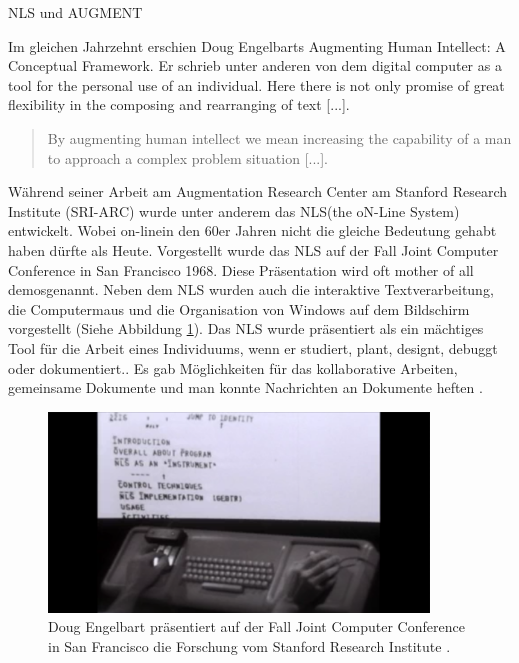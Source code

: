 \begin{section}{NLS und AUGMENT}
\label{sec:nls}

Im gleichen Jahrzehnt erschien Doug Engelbarts \glqq Augmenting Human Intellect: A Conceptual Framework\grqq{ }. Er schrieb unter anderen von dem \glqq digital computer as a tool for the personal use of an individual. Here there is not only promise of great flexibility in the composing and rearranging of text [...]\grqq{ }\cite[S. 17]{Engelbart1962}.

\begin{quote}
\glqq By augmenting human intellect we mean increasing the capability of a man to approach a complex problem situation [...].\grqq{ }\cite[S. 1]{Engelbart1962}
\end{quote}

Während seiner Arbeit am Augmentation Research Center am Stanford Research Institute (SRI-ARC) wurde unter anderem das \glqq NLS\grqq{ }(the oN-Line System) entwickelt. Wobei \glqq on-line\grqq{ }in den 60er Jahren nicht die gleiche Bedeutung gehabt haben dürfte als Heute. Vorgestellt wurde das NLS auf der Fall Joint Computer Conference in San Francisco 1968. Diese Präsentation wird oft \glqq mother of all demos\grqq{ }genannt. Neben dem NLS wurden auch die interaktive Textverarbeitung, die Computermaus und die Organisation von Windows auf dem Bildschirm vorgestellt (Siehe Abbildung \ref{fig:mother}). Das NLS wurde präsentiert als \glqq ein mächtiges Tool für die Arbeit eines Individuums, wenn er studiert, plant, designt, debuggt oder dokumentiert.\grqq{ }\cite{MotherOfDemo1968}. Es gab Möglichkeiten für das kollaborative Arbeiten, gemeinsame Dokumente und man konnte Nachrichten an Dokumente heften \cite{MotherOfDemo1968}. 

\begin{figure}[!ht]
	\centering
	\includegraphics[width=0.9\textwidth]{image/mother}
	\caption{Doug Engelbart präsentiert auf der Fall Joint Computer Conference in San Francisco die Forschung vom Stanford Research Institute \cite{MotherOfDemo1968}.}
	\label{fig:mother}
\end{figure}


\end{section}
